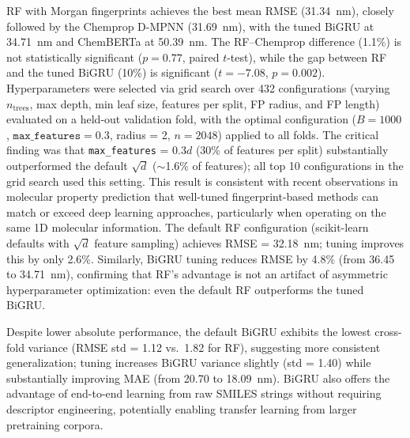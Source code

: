RF with Morgan fingerprints achieves the best mean RMSE (31.34~nm), closely followed by the Chemprop D-MPNN (31.69~nm), with the tuned BiGRU at 34.71~nm and ChemBERTa at 50.39~nm.
The RF--Chemprop difference (1.1\%) is not statistically significant ($p = 0.77$, paired $t$-test), while the gap between RF and the tuned BiGRU (10\%) is significant ($t = -7.08$, $p = 0.002$).
Hyperparameters were selected via grid search over 432 configurations (varying $n_\text{trees}$, max depth, min leaf size, features per split, FP radius, and FP length) evaluated on a held-out validation fold, with the optimal configuration ($B = 1000$, $\texttt{max\_features} = 0.3$, radius = 2, $n = 2048$) applied to all folds.
The critical finding was that \texttt{max\_features} = $0.3d$ (30\% of features per split) substantially outperformed the default $\sqrt{d}$ ($\sim$1.6\% of features); all top 10 configurations in the grid search used this setting.
This result is consistent with recent observations in molecular property prediction that well-tuned fingerprint-based methods can match or exceed deep learning approaches, particularly when operating on the same 1D molecular information\cite{panapitiya2022evaluation, walters2021applications}.
The default RF configuration (scikit-learn defaults with $\sqrt{d}$ feature sampling) achieves RMSE = 32.18~nm; tuning improves this by only 2.6\%.
Similarly, BiGRU tuning reduces RMSE by 4.8\% (from 36.45 to 34.71~nm), confirming that RF's advantage is not an artifact of asymmetric hyperparameter optimization: even the default RF outperforms the tuned BiGRU.

Despite lower absolute performance, the default BiGRU exhibits the lowest cross-fold variance (RMSE std = 1.12 vs.\ 1.82 for RF), suggesting more consistent generalization; tuning increases BiGRU variance slightly (std = 1.40) while substantially improving MAE (from 20.70 to 18.09~nm).
BiGRU also offers the advantage of end-to-end learning from raw SMILES strings without requiring descriptor engineering\cite{chenMolecularLanguage2023}, potentially enabling transfer learning from larger pretraining corpora\cite{vermeire2021transfer}.

